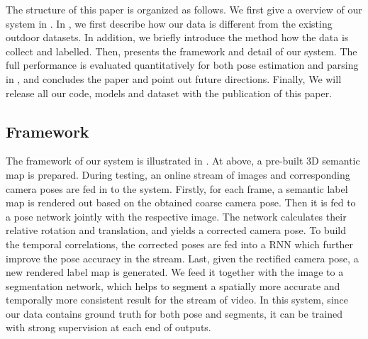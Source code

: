 The structure of this paper is organized as follows. We first give a overview of our system in . In , we first describe how our data is different from the existing outdoor datasets. In addition, we briefly introduce the method how the data is collect and labelled. Then,  presents the framework and detail of our system. The full performance is evaluated quantitatively for both pose estimation and parsing in , and  concludes the paper and point out future directions. Finally, We will release all our code, models and dataset with the publication of this paper.


\subsection{Framework}
\label{sub:framework}
The framework of our system is illustrated in . At above, a pre-built 3D semantic map is prepared. During testing, an online stream of images and corresponding camera poses are fed in to the system. Firstly, for each frame, a semantic label map is rendered out based on the obtained coarse camera pose. Then it is fed to a pose network jointly with the respective image.  The network calculates their relative rotation and translation, and yields a corrected camera pose. To build the temporal correlations, the corrected poses are fed into a RNN which further improve the pose accuracy in the stream.
Last, given the rectified camera pose, a new rendered label map is generated. We feed it together with the image to a segmentation network, which helps to segment a spatially more accurate and temporally more consistent result for the stream of video.
In this system, since our data contains ground truth for both pose and segments, it can be trained with strong supervision at each end of outputs.
